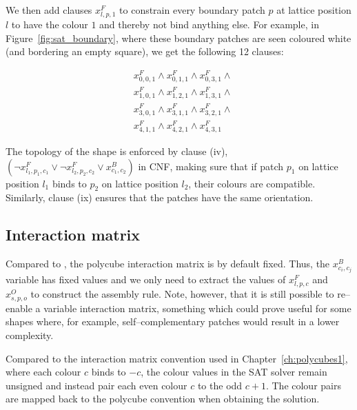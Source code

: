 We then add clauses \(x_{l,p,1}^{F}\) to constrain every boundary patch \(p\) at lattice position \(l\) to have the colour \(1\) and thereby not bind anything else. For example, in Figure~\ref{fig:sat_boundary}, where these boundary patches are seen coloured white (and bordering an empty square), we get the following 12 clauses:

\begin{equation}
    \begin{aligned}
        &x_{0,0,1}^{F} \land x_{0,1,1}^{F} \land x_{0,3,1}^{F} \land \\
        &x_{1,0,1}^{F} \land x_{1,2,1}^{F} \land x_{1,3,1}^{F} \land \\
        &x_{3,0,1}^{F} \land x_{3,1,1}^{F} \land x_{3,2,1}^{F} \land \\
        &x_{4,1,1}^{F} \land x_{4,2,1}^{F} \land x_{4,3,1}^{F}
    \end{aligned}
\end{equation}

The topology of the shape is enforced by clause (iv), \(\left(\lnot x_{l_1, p_1, c_1}^{F} \lor \lnot x_{l_2, p_2, c_2}^{F} \lor x_{c_1, c_2}^{B}\right)\) in CNF, making sure that if patch \(p_1\) on lattice position \(l_1\) binds to \(p_2\) on lattice position \(l_2\), their colours are compatible. Similarly, clause (ix) ensures that the patches have the same orientation.


\subsection{Interaction matrix}
Compared to \cite{romano2020designing}, the polycube interaction matrix is by default fixed. Thus, the \(x_{c_i,c_j}^{B}\) variable has fixed values and we only need to extract the values of \(x_{l,p,c}^{F}\) and \(x_{s,p,o}^{O}\) to construct the assembly rule. Note, however, that it is still possible to re--enable a variable interaction matrix, something which could prove useful for some shapes where, for example, self--complementary patches would result in a lower complexity.

Compared to the interaction matrix convention used in Chapter~\ref{ch:polycubes1}, where each colour \(c\) binds to \(-c\), the colour values in the SAT solver remain unsigned and instead pair each even colour \(c\) to the odd \(c+1\). The colour pairs are mapped back to the polycube convention when obtaining the solution.

